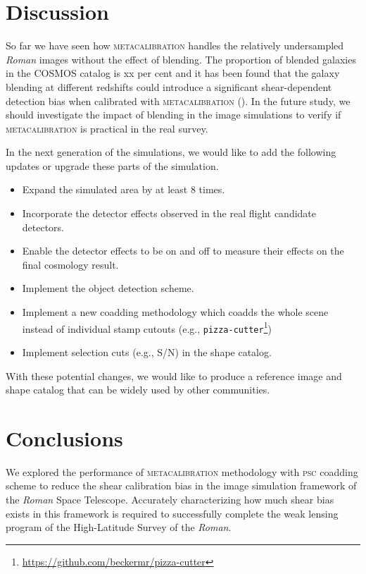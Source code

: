 \documentclass[fleqn,usenatbib]{mnras}
\begin{document}
\section{Discussion}
\label{sec:discussion}

So far we have seen how \textsc{metacalibration} handles the relatively undersampled \emph{Roman} images without the effect of blending. The proportion of blended galaxies in the COSMOS catalog is xx per cent and it has been found that the galaxy blending at different redshifts could introduce a significant shear-dependent detection bias when calibrated with \textsc{metacalibration} (\citealt{2020ApJ...902..138S}). In the future study, we should investigate the impact of blending in the image simulations to verify if \textsc{metacalibration} is practical in the real survey. 


In the next generation of the simulations, we would like to add the following updates or upgrade these parts of the simulation. 
\begin{itemize}
    \item Expand the simulated area by at least 8 times.
    \item Incorporate the detector effects observed in the real flight candidate detectors.
    \item Enable the detector effects to be on and off to measure their effects on the final cosmology result.
    \item Implement the object detection scheme.
    \item Implement a new coadding methodology which coadds the whole scene instead of individual stamp cutouts (e.g., \texttt{pizza-cutter}\footnote{\url{https://github.com/beckermr/pizza-cutter}})
    \item Implement selection cuts (e.g., S/N) in the shape catalog.
\end{itemize}
With these potential changes, we would like to produce a reference image and shape catalog that can be widely used by other communities. 


\section{Conclusions}
\label{sec:conclusion}
We explored the performance of \textsc{metacalibration} methodology with \textsc{psc} coadding scheme to reduce the shear calibration bias in the image simulation framework of the \emph{Roman} Space Telescope. Accurately characterizing how much shear bias exists in this framework is required to successfully complete the weak lensing program of the High-Latitude Survey of the \emph{Roman}. \par
\end{document}
